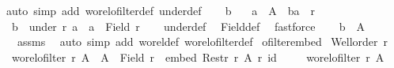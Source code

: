 \begin{isabellebody}
\isamarkupfalse%
{\isacharparenleft}{\kern0pt}auto\ simp\ add{\isacharcolon}{\kern0pt}\ wo{\isacharunderscore}{\kern0pt}rel{\isachardot}{\kern0pt}ofilter{\isacharunderscore}{\kern0pt}def\ under{\isacharunderscore}{\kern0pt}def{\isacharparenright}{\kern0pt}\isanewline
\ \ \isamarkupfalse%
\ b\ \isamarkupfalse%
\ {\isacharasterisk}{\kern0pt}{\isacharcolon}{\kern0pt}\ {\isachardoublequoteopen}a\ {\isasymin}\ A{\isachardoublequoteclose}\ \ {\isachardoublequoteopen}{\isacharparenleft}{\kern0pt}b{\isacharcomma}{\kern0pt}a{\isacharparenright}{\kern0pt}\ {\isasymin}\ r{\isachardoublequoteclose}\isanewline
\ \ \isamarkupfalse%
\ {\isachardoublequoteopen}b\ {\isasymin}\ under\ r\ a\ {\isasymand}\ a\ {\isasymin}\ Field\ r{\isachardoublequoteclose}\isanewline
\ \ \isamarkupfalse%
\ under{\isacharunderscore}{\kern0pt}def\ \isamarkupfalse%
\ Field{\isacharunderscore}{\kern0pt}def\ \isamarkupfalse%
\ fastforce\isanewline
\ \ \isamarkupfalse%
\ {\isachardoublequoteopen}b\ {\isasymin}\ A{\isachardoublequoteclose}\ \isamarkupfalse%
\ {\isacharasterisk}{\kern0pt}\ assms\ \isamarkupfalse%
\ {\isacharparenleft}{\kern0pt}auto\ simp\ add{\isacharcolon}{\kern0pt}\ wo{\isacharunderscore}{\kern0pt}rel{\isacharunderscore}{\kern0pt}def\ wo{\isacharunderscore}{\kern0pt}rel{\isachardot}{\kern0pt}ofilter{\isacharunderscore}{\kern0pt}def{\isacharparenright}{\kern0pt}\isanewline
{}\isamarkupfalse%
%
\endisatagproof
{\isafoldproof}%
%
\isadelimproof
\isanewline
%
\endisadelimproof
\isanewline
{}\isamarkupfalse%
\ ofilter{\isacharunderscore}{\kern0pt}embed{\isacharcolon}{\kern0pt}\isanewline
{}\ {\isachardoublequoteopen}Well{\isacharunderscore}{\kern0pt}order\ r{\isachardoublequoteclose}\isanewline
{}\ {\isachardoublequoteopen}wo{\isacharunderscore}{\kern0pt}rel{\isachardot}{\kern0pt}ofilter\ r\ A\ {\isacharequal}{\kern0pt}\ {\isacharparenleft}{\kern0pt}A\ {\isasymle}\ Field\ r\ {\isasymand}\ embed\ {\isacharparenleft}{\kern0pt}Restr\ r\ A{\isacharparenright}{\kern0pt}\ r\ id{\isacharparenright}{\kern0pt}{\isachardoublequoteclose}\isanewline
%
\isadelimproof
%
\endisadelimproof
%
\isatagproof
{}\isamarkupfalse%
\isanewline
\ \ \isamarkupfalse%
\ {\isacharasterisk}{\kern0pt}{\isacharcolon}{\kern0pt}\ {\isachardoublequoteopen}wo{\isacharunderscore}{\kern0pt}rel{\isachardot}{\kern0pt}ofilter\ r\ A{\isachardoublequoteclose}\isanewline

\end{isabellebody}
